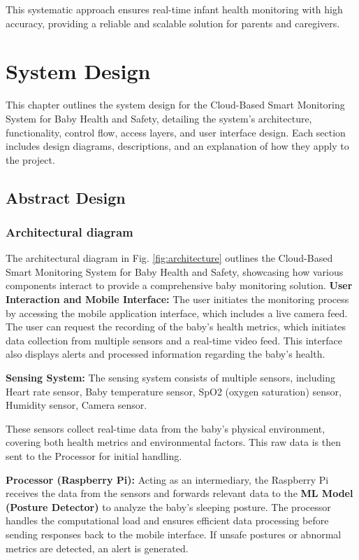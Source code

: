 \documentclass[conference]{IEEEtran}
\begin{document}
This systematic approach ensures real-time infant health monitoring with high accuracy, providing a reliable and scalable solution for parents and caregivers.


\section{System Design}
This chapter outlines the system design for the Cloud-Based Smart Monitoring System for Baby Health and Safety, detailing the system's architecture, functionality, control flow, access layers, and user interface design. Each section includes design diagrams, descriptions, and an explanation of how they apply to the project.
\subsection{Abstract Design}

\subsubsection{Architectural diagram}

The architectural diagram in Fig. \ref{fig:architecture} outlines the Cloud-Based Smart Monitoring System for Baby Health and Safety, showcasing how various components interact to provide a comprehensive baby monitoring solution.
\textbf{User Interaction and Mobile Interface:} The user initiates the monitoring process by accessing the mobile application interface, which includes a live camera feed. The user can request the recording of the baby’s health metrics, which initiates data collection from multiple sensors and a real-time video feed. This interface also displays alerts and processed information regarding the baby’s health.

\textbf{Sensing System:} The sensing system consists of multiple sensors, including Heart rate sensor, Baby temperature sensor, SpO2 (oxygen saturation) sensor, Humidity sensor, Camera sensor.

These sensors collect real-time data from the baby’s physical environment, covering both health metrics and environmental factors. This raw data is then sent to the Processor for initial handling.

\textbf{Processor (Raspberry Pi):} Acting as an intermediary, the Raspberry Pi receives the data from the sensors and forwards relevant data to the \textbf{ML Model (Posture Detector)} to analyze the baby’s sleeping posture. The processor handles the computational load and ensures efficient data processing before sending responses back to the mobile interface. If unsafe postures or abnormal metrics are detected, an alert is generated.
\end{document}

